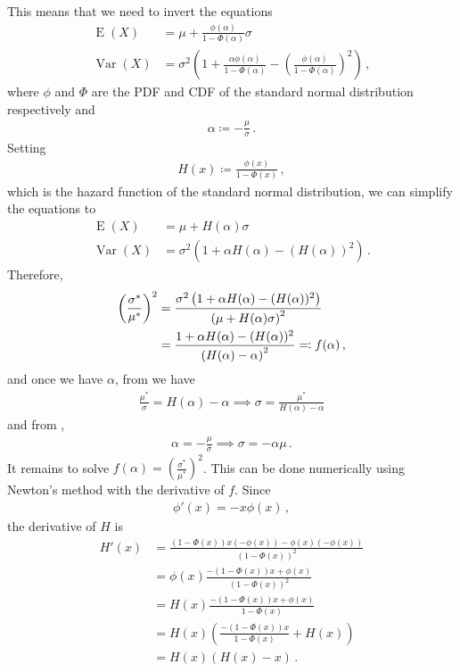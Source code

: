 \documentclass{article}
\DeclareMathOperator{\E}{E}
\DeclareMathOperator{\Var}{Var}
\begin{document}
%
This means that we need to invert the equations
%
\begin{align*}
	\E(X) &= \mu + \frac{\phi(\alpha)}{1 - \Phi(\alpha)} \sigma \\
	\Var(X) &= \sigma ^ 2 \left(1 + \frac{\alpha \phi(\alpha)}{1 - \Phi(\alpha)}
		- \left(\frac{\phi(\alpha)}{1 - \Phi(\alpha)}\right) ^ 2\right) \,,
\end{align*}
%
where $\phi$ and $\Phi$ are the PDF and CDF of the
standard normal distribution respectively and
%
\begin{align}
	\alpha \coloneqq -\frac{\mu}{\sigma} \,.
	\label{tn-alpha}
\end{align}
%
Setting
%
\begin{align*}
	H(x) \coloneqq \frac{\phi(x)}{1 - \Phi(x)} \,,
\end{align*}
%
which is the hazard function of the standard normal distribution, we can
simplify the equations to
%
\begin{align}
	\E(X) &= \mu + H(\alpha)\sigma \label{tn-mean} \\
	\Var(X) &= \sigma ^ 2 \left(1 + \alpha H(\alpha) - (H(\alpha)) ^ 2 \right)
		\label{tn-var} \,.
\end{align}
%
Therefore,
%
\begin{align*}
	\left(\frac{\sigma^*}{\mu^*}\right)^2 &=
		\frac{\sigma ^ 2 \left(1 + \alpha H(\alpha) - (H(\alpha)) ^ 2 \right)}{%
		\left(\mu + H(\alpha) \sigma\right) ^ 2} \\
	&= \frac{1 + \alpha H(\alpha) - (H(\alpha)) ^ 2}
		{\left(H(\alpha) - \alpha\right) ^ 2} \eqqcolon f(\alpha) \,, \\
\end{align*}
%
and once we have $\alpha$, from  we have
%
\begin{align*}
	\frac{\mu^*}{\sigma} = H(\alpha) - \alpha
		\implies \sigma = \frac{\mu^*}{H(\alpha) - \alpha}
\end{align*}
%
and from ,
%
\begin{align*}
	\alpha = -\frac{\mu}{\sigma} \implies \sigma =  -\alpha \mu \,.
\end{align*}
%
It remains to solve $f(\alpha) = \left(\frac{\sigma^*}{\mu^*}\right) ^ 2$.
This can be done numerically using Newton's method with the derivative of $f$.
Since
%
\begin{align*}
	\phi'(x) = -x \phi(x) \,,
\end{align*}
%
the derivative of $H$ is
%
\begin{align*}
	H'(x) &= \frac{(1 - \Phi(x)) x (-\phi(x))
		- \phi(x)(- \phi(x))}{(1 - \Phi(x))^2} \\
	&= \phi(x) \frac{-(1 - \Phi(x)) x + \phi(x)}
		{(1 - \Phi(x))^2} \\
	&= H(x) \frac{-(1 - \Phi(x)) x + \phi(x)}
		{1 - \Phi(x)} \\
	&= H(x) \left(\frac{-(1 - \Phi(x)) x}
		{1 - \Phi(x)} + H(x) \right) \\
	&= H(x) \left(H(x) - x \right) \,.
\end{align*}
\end{document}
